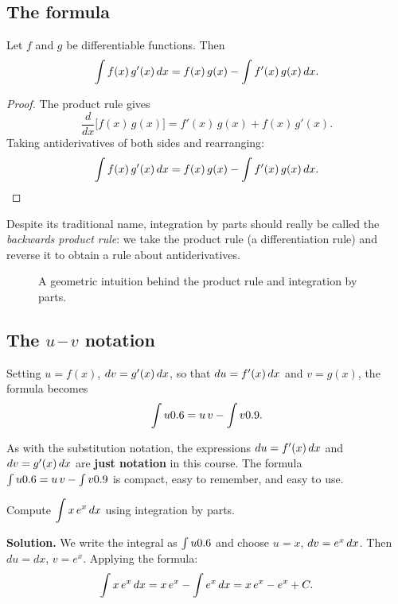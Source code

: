 \subsection*{The formula}

\begin{theorem}
\label{thm:9-3}
Let $f$ and $g$ be differentiable functions.  Then
\[
  \int f(x)\,g'(x)\,dx = f(x)\,g(x) - \int f'(x)\,g(x)\,dx.
\]
\end{theorem}

\begin{proof}
The product rule gives
\[
  \frac{d}{dx}\bigl[f(x)\,g(x)\bigr] = f'(x)\,g(x) + f(x)\,g'(x).
\]
Taking antiderivatives of both sides and rearranging:
\[
  \int f(x)\,g'(x)\,dx = f(x)\,g(x) - \int f'(x)\,g(x)\,dx. \qedhere
\]
\end{proof}

\begin{remark}
Despite its traditional name, integration by parts should really be called the \textit{backwards product rule}: we take the product rule (a differentiation rule) and reverse it to obtain a rule about antiderivatives.
\end{remark}

\begin{figure}[ht]
  \centering
  
  \caption{A geometric intuition behind the product rule and integration by parts.}
  \label{fig:by-parts-rectangle}
\end{figure}

\subsection*{The $u$\,--\,$v$ notation}

Setting $u = f(x)$, $dv = g'(x)\,dx$, so that $du = f'(x)\,dx$ and $v = g(x)$, the formula becomes
\[
  \int u0.6 = u\,v - \int v0.9.
\]

\begin{remark}
As with the substitution notation, the expressions $du = f'(x)\,dx$ and $dv = g'(x)\,dx$ are \textbf{just notation} in this course.  The formula $\int u0.6 = u\,v - \int v0.9$ is compact, easy to remember, and easy to use.
\end{remark}

\begin{example}
\label{ex:9-8}
Compute $\displaystyle\int x\,e^{x}\,dx$ using integration by parts.

\textbf{Solution.}  We write the integral as $\int u0.6$ and choose $u = x$, $dv = e^{x}\,dx$.  Then $du = dx$, $v = e^{x}$.  Applying the formula:
\[
  \int x\,e^{x}\,dx = x\,e^{x} - \int e^{x}\,dx = x\,e^{x} - e^{x} + C.
\]
\end{example}


